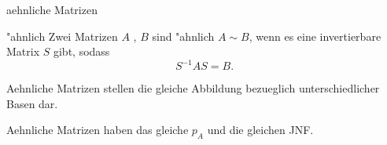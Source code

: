 \documentclass[class=article, crop=false]{standalone}
\begin{document}
\begin{zettel}{aehnliche Matrizen}
\begin{flashcard}[]{}
	\begin{definition}{"ahnlich}
		Zwei Matrizen $A$ , $B$ sind "ahnlich $A \sim B$, wenn es eine invertierbare Matrix $S$ gibt, sodass
		\[
			S^{-1} AS = B
		.\]
	\end{definition}
\end{flashcard}

Aehnliche Matrizen stellen die gleiche Abbildung bezueglich unterschiedlicher Basen dar.

Aehnliche Matrizen haben das gleiche $p_{A}$ und die gleichen JNF.
\end{zettel}
\end{document}
